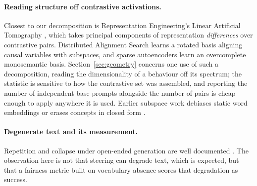 \paragraph{Reading structure off contrastive activations.} Closest to our decomposition
is Representation Engineering's Linear Artificial Tomography \citep{zou2023representation},
which takes principal components of representation \textit{differences} over contrastive
pairs. Distributed Alignment Search \citep{geiger2024das} learns a rotated basis aligning
causal variables with subspaces, and sparse autoencoders \citep{cunningham2024sae} learn
an overcomplete monosemantic basis. Section~\ref{sec:geometry} concerns one use of such a
decomposition, reading the dimensionality of a behaviour off its spectrum; the statistic
is sensitive to how the contrastive set was assembled, and reporting the number of
independent base prompts alongside the number of pairs is cheap enough to apply anywhere
it is used. Earlier subspace work debiases static word embeddings
\citep{bolukbasi2016man, ravfogel2020null} or erases concepts in closed form
\citep{belrose2023leace}.

\paragraph{Degenerate text and its measurement.} Repetition and collapse under
open-ended generation are well documented \citep{welleck-etal-2019-neural}. The
observation here is not that steering can degrade text, which is expected, but that a
fairness metric built on vocabulary absence scores that degradation as success.

